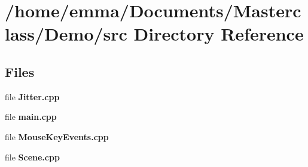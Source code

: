 \section{/home/emma/\+Documents/\+Masterclass/\+Demo/src Directory Reference}
\label{dir_cbe08c992f5ecda75c19b6cd830f5fd6}
\subsection*{Files}
\begin{DoxyCompactItemize}
\item 
file \textbf{ Jitter.\+cpp}
\item 
file \textbf{ main.\+cpp}
\item 
file \textbf{ Mouse\+Key\+Events.\+cpp}
\item 
file \textbf{ Scene.\+cpp}
\end{DoxyCompactItemize}
